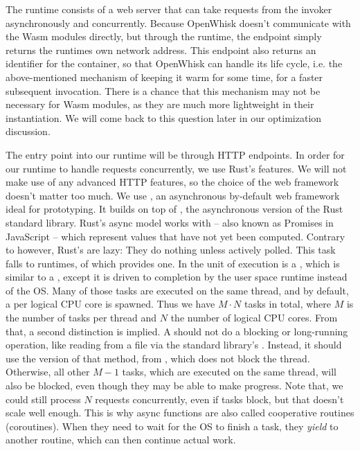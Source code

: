 The runtime consists of a web server that can take requests from the invoker asynchronously and concurrently. Because OpenWhisk doesn't communicate with the Wasm modules directly, but through the runtime, the  endpoint simply returns the runtimes own network address. This endpoint also returns an identifier for the container, so that OpenWhisk can handle its life cycle, i.e. the above-mentioned mechanism of keeping it warm for some time, for a faster subsequent invocation. There is a chance that this mechanism may not be necessary for Wasm modules, as they are much more lightweight in their instantiation. We will come back to this question later in our optimization discussion.

The entry point into our runtime will be through HTTP endpoints. In order for our runtime to handle requests concurrently, we use Rust's  features. We will not make use of any advanced HTTP features, so the choice of the web framework doesn't matter too much. We use  \cite{Turon2021}, an asynchronous by-default web framework ideal for prototyping. It builds on top of , the asynchronous version of the Rust standard library.
Rust's async model works with  -- also known as Promises in JavaScript -- which represent values that have not yet been computed. Contrary to  however, Rust's  are lazy: They do nothing unless actively polled. This task falls to  runtimes, of which  provides one. In  the unit of execution is a , which is similar to a , except it is driven to completion by the user space runtime instead of the OS. Many of those tasks are executed on the same thread, and by default, a  per logical CPU core is spawned. Thus we have $M \cdot N$ tasks in total, where $M$ is the number of tasks per thread and $N$ the number of logical CPU cores.
From that, a second distinction is implied. A  should not do a blocking or long-running operation, like reading from a file via the standard library's . Instead, it should use the  version of that method, from , which does not block the thread. Otherwise, all other $M - 1$ tasks, which are executed on the same thread, will also be blocked, even though they may be able to make progress. Note that, we could still process $N$ requests concurrently, even if tasks block, but that doesn't scale well enough. This is why async functions are also called cooperative routines (coroutines). When they need to wait for the OS to finish a task, they \emph{yield} to another routine, which can then continue actual work.


